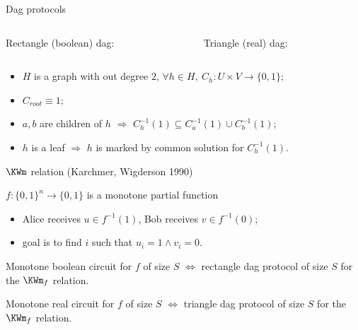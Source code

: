 \begin{frame}{Dag protocols}
    \vspace{-1cm}
    \begin{columns}[t]
		\begin{column}{0.48\textwidth}
            \begin{center}
                Rectangle (boolean) dag:
                \vspace{0.2cm}
                
            \end{center}
        \end{column}

		\begin{column}{0.48\textwidth}
            \begin{center}
                Triangle (real) dag:
                \vspace{0.2cm}
                
            \end{center}
		\end{column}
	\end{columns}

    \pause
    \begin{itemize}
        \item $H$ is a graph with out degree $2$, $\forall h \in H, ~ C_h: U \times V \to \{0, 1\}$;
        \item $C_{root} \equiv 1$;
        \item $a, b$ are children of $h$ $\Rightarrow$ $C_{h}^{-1}(1) \subseteq C_{a}^{-1}(1) \cup
            C_{b}^{-1}(1)$;
        \item $h$ is a leaf $\Rightarrow$ $h$ is marked by common solution for $C_h^{-1}(1)$.
    \end{itemize}

\end{frame}


\begin{frame}{$\KWm$ relation (Karchmer, Wigderson 1990)}

    $f:\{0, 1\}^n \to \{0, 1\}$ is a monotone partial function
    
    \begin{itemize}
        \item Alice receives $u \in f^{-1}(1)$, Bob receives $v \in f^{-1}(0)$;
        \item goal is to find $i$ such that $u_i = 1 \land v_i = 0$.
    \end{itemize}

    \pause

    \begin{theorem}
        Monotone boolean circuit for $f$ of size $S$ $\Leftrightarrow$ rectangle dag protocol of size $S$
        for the $\KWm_f$ relation.
    \end{theorem}

    \pause

    \begin{theorem}
        Monotone real circuit for $f$ of size $S$ $\Leftrightarrow$ triangle dag protocol of size $S$
        for the $\KWm_f$ relation.
    \end{theorem}
\end{frame}


